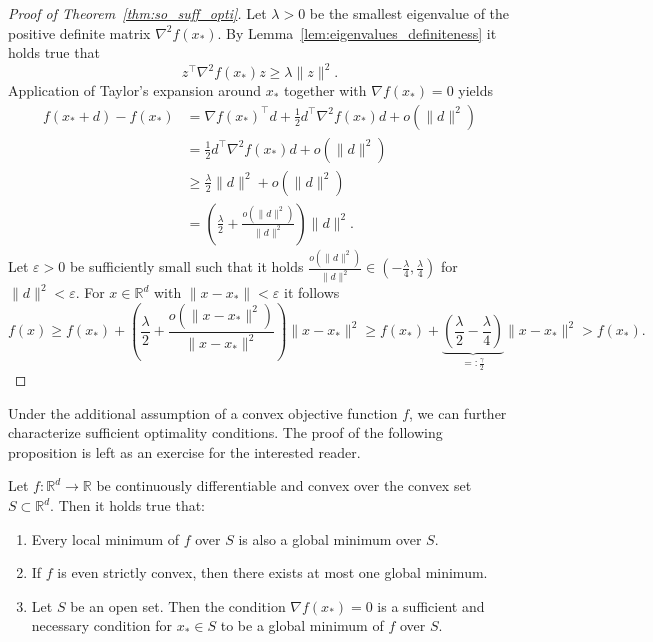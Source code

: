 \documentclass[12pt,openany]{book}
\theoremstyle{definition}
\theoremstyle{definition}
\newcommand{\R}{\mathbb{R}}
\begin{document}
\begin{proof}[Proof of Theorem~\ref{thm:so_suff_opti}]
Let $\lambda>0$ be the smallest eigenvalue of the positive definite matrix $\nabla^2 f(x_\ast)$. By Lemma~\ref{lem:eigenvalues_definiteness} it holds true that
\[z^\top \nabla^2 f(x_\ast) z \ge \lambda \|z\|^2.\]
Application of Taylor's expansion around $x_\ast$ together with $\nabla f(x_\ast)=0$ yields 
\begin{align*}
f(x_\ast + d) - f(x_\ast) &= \nabla f(x_\ast)^\top d + \frac12 d^\top \nabla^2 f(x_\ast) d + o(\|d\|^2)\\
&= \frac12 d^\top \nabla^2 f(x_\ast)d + o(\|d\|^2)\\
&\ge\frac{ \lambda}2 \|d\|^2 + o(\|d\|^2)\\
&= \left(\frac{\lambda}2+ \frac{o(\|d\|^2)}{\|d\|^2}\right) \|d\|^2.
\end{align*}
Let $\varepsilon>0$ be sufficiently small such that it holds $\frac{o(\|d\|^2)}{\|d\|^2}\in(-\frac\lambda4,\frac\lambda4)$ for $\|d\|^2<\varepsilon$. For $x\in\R^d$ with $\|x-x_\ast\|<\varepsilon$ it follows
\[f(x) \ge f(x_\ast) + \left(\frac{\lambda}{2} + \frac{o(\|x-x_\ast\|^2)}{\|x-x_\ast\|^2}\right)\|x-x_\ast\|^2\ge f(x_\ast) + \underbrace{(\frac{\lambda}{2}- \frac{\lambda}{4})}_{=: \frac{\gamma}{2}} \|x-x_\ast\|^2>f(x_\ast). \]
\end{proof}

Under the additional assumption of a convex objective function $f$, we can further characterize sufficient optimality conditions. The proof of the following proposition is left as an exercise for the interested reader.
\begin{prop}\label{prop:opt_cond_convex}
Let $f:\R^d\to \R$ be continuously differentiable and convex over the convex set $S\subset \R^d$. Then it holds true that:
\begin{enumerate}
\item Every local minimum of $f$ over $S$ is also a global minimum over $S$.
\item If $f$ is even strictly convex, then there exists at most one global minimum. 
\item Let $S$ be an open set. Then the condition $\nabla f(x_\ast)=0$ is a sufficient and necessary condition for $x_\ast\in S$ to be a global minimum of $f$ over $S$.
\end{enumerate}
\end{prop}
\end{document}
